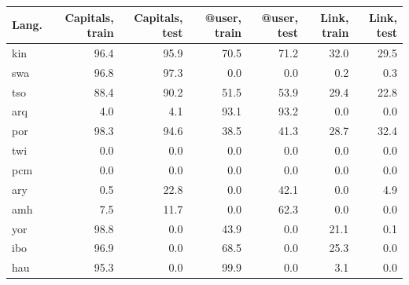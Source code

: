 \begin{tabular}{lrrrrrr}
\toprule
Lang. & Capitals, train & Capitals, test & @user, train & @user, test & Link, train & Link, test \\
\midrule
kin & 96.4 & 95.9 & 70.5 & 71.2 & 32.0 & 29.5 \\
swa & 96.8 & 97.3 & 0.0 & 0.0 & 0.2 & 0.3 \\
tso & 88.4 & 90.2 & 51.5 & 53.9 & 29.4 & 22.8 \\
arq & 4.0 & 4.1 & 93.1 & 93.2 & 0.0 & 0.0 \\
por & 98.3 & 94.6 & 38.5 & 41.3 & 28.7 & 32.4 \\
twi & 0.0 & 0.0 & 0.0 & 0.0 & 0.0 & 0.0 \\
pcm & 0.0 & 0.0 & 0.0 & 0.0 & 0.0 & 0.0 \\
ary & 0.5 & 22.8 & 0.0 & 42.1 & 0.0 & 4.9 \\
amh & 7.5 & 11.7 & 0.0 & 62.3 & 0.0 & 0.0 \\
yor & 98.8 & 0.0 & 43.9 & 0.0 & 21.1 & 0.1 \\
ibo & 96.9 & 0.0 & 68.5 & 0.0 & 25.3 & 0.0 \\
hau & 95.3 & 0.0 & 99.9 & 0.0 & 3.1 & 0.0 \\
\bottomrule
\end{tabular}
